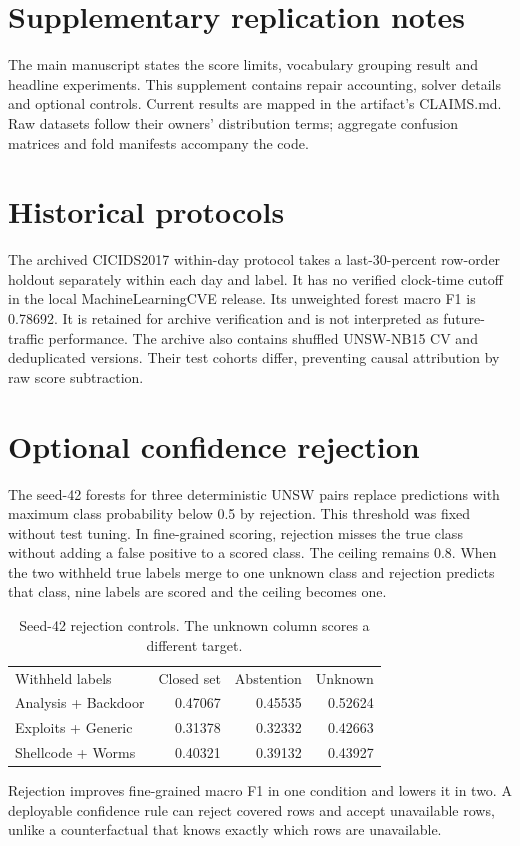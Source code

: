 \documentclass{article}
\begin{document}
\section*{Supplementary replication notes}
The main manuscript states the score limits, vocabulary grouping result and headline experiments. This supplement contains repair accounting, solver details and optional controls. Current results are mapped in the artifact's CLAIMS.md. Raw datasets follow their owners' distribution terms; aggregate confusion matrices and fold manifests accompany the code.

\section*{Historical protocols}
The archived CICIDS2017 within-day protocol takes a last-30-percent row-order holdout separately within each day and label. It has no verified clock-time cutoff in the local MachineLearningCVE release. Its unweighted forest macro F1 is 0.78692. It is retained for archive verification and is not interpreted as future-traffic performance. The archive also contains shuffled UNSW-NB15 CV and deduplicated versions. Their test cohorts differ, preventing causal attribution by raw score subtraction.

\section*{Optional confidence rejection}
The seed-42 forests for three deterministic UNSW pairs replace predictions with maximum class probability below 0.5 by rejection. This threshold was fixed without test tuning. In fine-grained scoring, rejection misses the true class without adding a false positive to a scored class. The ceiling remains 0.8. When the two withheld true labels merge to one unknown class and rejection predicts that class, nine labels are scored and the ceiling becomes one.

\begin{table}[h]\centering
\caption{Seed-42 rejection controls. The unknown column scores a different target.}
\begin{tabular}{lrrr}
Withheld labels & Closed set & Abstention & Unknown\\
Analysis + Backdoor & 0.47067 & 0.45535 & 0.52624\\
Exploits + Generic & 0.31378 & 0.32332 & 0.42663\\
Shellcode + Worms & 0.40321 & 0.39132 & 0.43927\\
\end{tabular}\end{table}
Rejection improves fine-grained macro F1 in one condition and lowers it in two. A deployable confidence rule can reject covered rows and accept unavailable rows, unlike a counterfactual that knows exactly which rows are unavailable.
\end{document}
